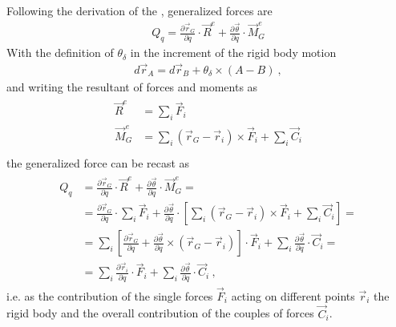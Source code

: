 \documentclass[letterpaper,10pt,english]{jupyterBook}
\begin{document}
\sphinxAtStartPar
Following the derivation of the {\hyperref[\detokenize{ch/lagrange-rigid-body:classical-mechanics-lagrange-rigid}]{}}, generalized forces are
\begin{equation*}
\begin{split}Q_q = \frac{\partial \vec{r}_G}{\partial q} \cdot \vec{R}^e + \frac{\partial \vec{\theta}}{\partial q} \cdot \vec{M}_G^e\end{split}
\end{equation*}
\sphinxAtStartPar
With the definition of \(\theta_{\delta}\) in the increment of the rigid body motion
\begin{equation*}
\begin{split}d \vec{r}_A = d \vec{r}_B + \theta_{\delta} \times (A - B) \ ,\end{split}
\end{equation*}
\sphinxAtStartPar
and writing the resultant of forces and moments as
\begin{equation*}
\begin{split}\begin{aligned}
  \vec{R}^e   & = \sum_i \vec{F}_i \\
  \vec{M}^e_G & = \sum_i \left( \vec{r}_G - \vec{r}_i \right) \times \vec{F}_i + \sum_i \vec{C}_i \\
\end{aligned}\end{split}
\end{equation*}
\sphinxAtStartPar
the generalized force can be recast as
\begin{equation*}
\begin{split}\begin{aligned}
  Q_q 
  & = \frac{\partial \vec{r}_G}{\partial q} \cdot \vec{R}^e + \frac{\partial \vec{\theta}}{\partial q} \cdot \vec{M}_G^e = \\
  & = \frac{\partial \vec{r}_G}{\partial q} \cdot \sum_i \vec{F}_i + \frac{\partial \vec{\theta}}{\partial q} \cdot \left[ \sum_i \left( \vec{r}_G - \vec{r}_i \right) \times \vec{F}_i + \sum_i \vec{C}_i  \right] = \\
  & = \sum_i \left[ \frac{\partial \vec{r}_G}{\partial q} + \frac{\partial \vec{\theta}}{\partial q} \times \left( \vec{r}_G - \vec{r}_i \right) \right] \cdot \vec{F}_i + \sum_i \frac{\partial \vec{\theta}}{\partial q} \cdot \vec{C}_i = \\
  & = \sum_i \frac{\partial \vec{r}_i}{\partial q} \cdot \vec{F}_i + \sum_i \frac{\partial \vec{\theta}}{\partial q} \cdot \vec{C}_i \ ,
\end{aligned}\end{split}
\end{equation*}
\sphinxAtStartPar
i.e. as the contribution of the single forces \(\vec{F}_i\) acting on different points \(\vec{r}_i\) the rigid body and the overall contribution of the couples of forces \(\vec{C}_i\).
\end{document}
